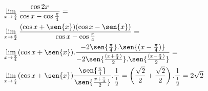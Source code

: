 \begin{ex}
\begin{align}
&\lim_{x\rightarrow \frac{\pi}{4}} \frac{\cos{2x}}{\cos{x}-\cos{\frac{\pi}{4}}}=\nonumber\\
&\lim_{x\rightarrow \frac{\pi}{4}} \frac{(\cos{x}+\sen{x})(\cos{x}-\sen{x})}{\cos{x}-\cos{\frac{\pi}{4}}}=\nonumber\\
&\lim_{x\rightarrow \frac{\pi}{4}} (\cos{x}+\sen{x}).\frac{-2\sen{\frac{\pi}{4}}.\sen{(x-\frac{\pi}{4})}}{-2\sen{\frac{(x+\frac{\pi}{4})}{2}}.\sen{\frac{(x-\frac{\pi}{4})}{2}}}=\nonumber\\
&\lim_{x\rightarrow \frac{\pi}{4}} (\cos{x}+\sen{x})\frac{\sen{\frac{\pi}{4}}}{\sen{\frac{x+\frac{\pi}{4}}{2}}}.\frac{1}{\frac{1}{2}}=\left(\frac{\sqrt{2}}{2}+\frac{\sqrt{2}}{2}\right).\frac{1}{\frac{1}{2}}=2\sqrt{2}\nonumber
\end{align}
\end{ex}